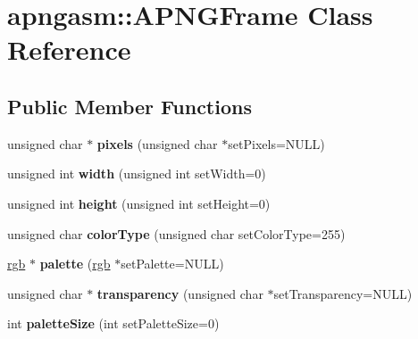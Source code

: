 \hypertarget{classapngasm_1_1APNGFrame}{\section{apngasm\-:\-:A\-P\-N\-G\-Frame Class Reference}
\label{classapngasm_1_1APNGFrame}
}
\subsection*{Public Member Functions}
\begin{DoxyCompactItemize}
\item 
\hypertarget{classapngasm_1_1APNGFrame_ae8d579fd5d59502d9afcbdd50e61793e}{unsigned char $\ast$ {\bfseries pixels} (unsigned char $\ast$set\-Pixels=N\-U\-L\-L)}\label{classapngasm_1_1APNGFrame_ae8d579fd5d59502d9afcbdd50e61793e}

\item 
\hypertarget{classapngasm_1_1APNGFrame_a3012655a0e7ee0870f8fbba8dc40198b}{unsigned int {\bfseries width} (unsigned int set\-Width=0)}\label{classapngasm_1_1APNGFrame_a3012655a0e7ee0870f8fbba8dc40198b}

\item 
\hypertarget{classapngasm_1_1APNGFrame_ab1d9bf50bf46c29bc132e4a240d11658}{unsigned int {\bfseries height} (unsigned int set\-Height=0)}\label{classapngasm_1_1APNGFrame_ab1d9bf50bf46c29bc132e4a240d11658}

\item 
\hypertarget{classapngasm_1_1APNGFrame_a02bafa9218bc7c6c0957d8773595de1b}{unsigned char {\bfseries color\-Type} (unsigned char set\-Color\-Type=255)}\label{classapngasm_1_1APNGFrame_a02bafa9218bc7c6c0957d8773595de1b}

\item 
\hypertarget{classapngasm_1_1APNGFrame_ace6bd0d2596cc7b3e3a30b833df065e0}{\hyperlink{structapngasm_1_1rgb}{rgb} $\ast$ {\bfseries palette} (\hyperlink{structapngasm_1_1rgb}{rgb} $\ast$set\-Palette=N\-U\-L\-L)}\label{classapngasm_1_1APNGFrame_ace6bd0d2596cc7b3e3a30b833df065e0}

\item 
\hypertarget{classapngasm_1_1APNGFrame_a03627c4c55d522a4ddc5e5a243e14471}{unsigned char $\ast$ {\bfseries transparency} (unsigned char $\ast$set\-Transparency=N\-U\-L\-L)}\label{classapngasm_1_1APNGFrame_a03627c4c55d522a4ddc5e5a243e14471}

\item 
\hypertarget{classapngasm_1_1APNGFrame_a1f6b7df1cf81499e2f2f303c755fd527}{int {\bfseries palette\-Size} (int set\-Palette\-Size=0)}\label{classapngasm_1_1APNGFrame_a1f6b7df1cf81499e2f2f303c755fd527}


\end{DoxyCompactItemize}
